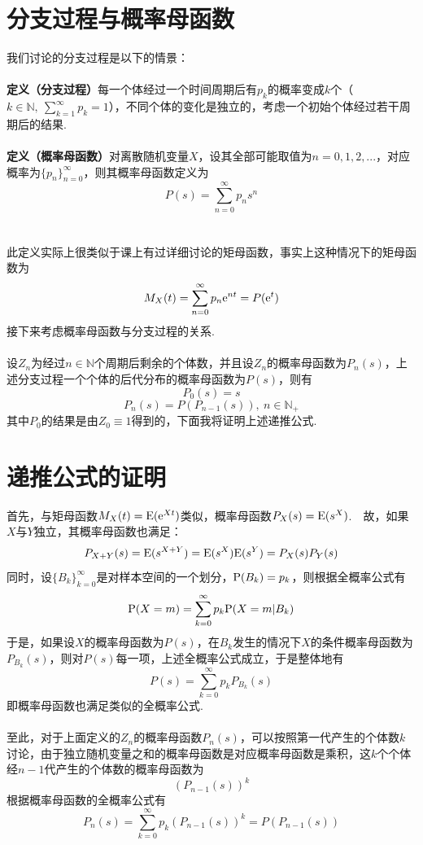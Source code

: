 \documentclass{article}
\begin{document}
\begin{CJK}{UTF8}{gbsn}
\section{分支过程与概率母函数}
我们讨论的分支过程是以下的情景：
\\\\
\textbf{定义（分支过程）}每一个体经过一个时间周期后有$p_{k}$的概率变成$k$个（$k\in\mathbb{N},\ \sum\limits_{k=1}^{\infty}p_{k}=1$），不同个体的变化是独立的，考虑一个初始个体经过若干周期后的结果.
\\\\
\textbf{定义（概率母函数）}对离散随机变量$X$，设其全部可能取值为$n=0,1,2,...$，对应概率为$\{p_{n}\}_{n=0}^{\infty}$，则其概率母函数定义为
$$P(s)=\sum\limits_{n=0}^{\infty}p_{n}s^{n}$$
\\\\
此定义实际上很类似于课上有过详细讨论的矩母函数，事实上这种情况下的矩母函数为
$$ M_{X}(t)=\sum\limits_{n=0}^{\infty}p_{n}{\rm e}^{nt}=P({\rm e}^{t}) $$
接下来考虑概率母函数与分支过程的关系.
\\\\
设$Z_{n}$为经过$n\in\mathbb{N}$个周期后剩余的个体数，并且设$Z_{n}$的概率母函数为$P_{n}(s)$，上述分支过程一个个体的后代分布的概率母函数为$P(s)$，则有
$$ P_{0}(s) = s $$
$$ P_{n}(s) = P(P_{n-1}(s)),\ n\in\mathbb{N}_{+} $$
其中$P_{0}$的结果是由$Z_{0}\equiv 1$得到的，下面我将证明上述递推公式.
\section{递推公式的证明}
首先，与矩母函数$M_{X}(t)={\rm E}({\rm e}^{Xt})$类似，概率母函数$P_{X}(s)={\rm E}(s^{X})$.\ \ 故，如果$X$与$Y$独立，其概率母函数也满足：
$$ P_{X+Y}(s)={\rm E}(s^{X+Y})={\rm E}(s^X){\rm E}(s^Y)=P_X(s)P_Y(s) $$
同时，设${\{B_{k}\}}_{k=0}^{\infty}$是对样本空间的一个划分，${\rm P}(B_k)=p_k$，则根据全概率公式有
$$ {\rm P}(X=m)=\sum\limits_{k=0}^{\infty}p_k{\rm P}(X=m|B_k) $$
于是，如果设$X$的概率母函数为$P(s)$，在$B_k$发生的情况下$X$的条件概率母函数为$P_{B_k}(s)$，则对$P(s)$每一项，上述全概率公式成立，于是整体地有
$$ P(s)=\sum\limits_{k=0}^{\infty}p_k P_{B_k}(s) $$
即概率母函数也满足类似的全概率公式.
\\\\
至此，对于上面定义的$Z_n$的概率母函数$P_n(s)$，可以按照第一代产生的个体数$k$讨论，由于独立随机变量之和的概率母函数是对应概率母函数是乘积，这$k$个个体经$n-1$代产生的个体数的概率母函数为
$$ (P_{n-1}(s))^k $$
根据概率母函数的全概率公式有
$$ P_n(s)=\sum\limits_{k=0}^{\infty}p_{k}(P_{n-1}(s))^k=P(P_{n-1}(s)) $$

\end{CJK}
\end{document}
